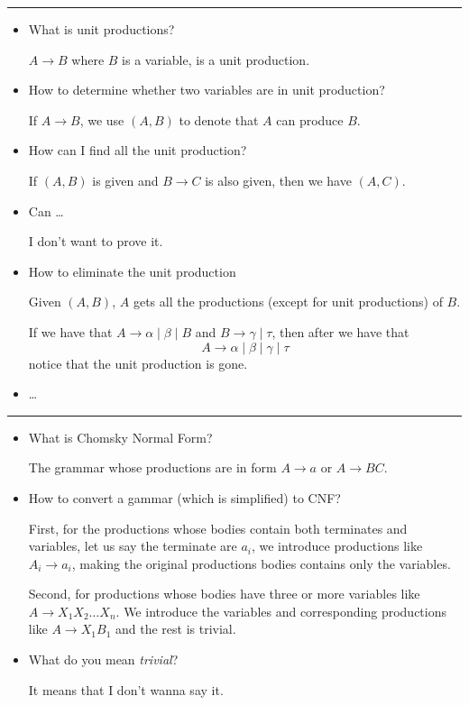 \documentclass[../main.tex]{subfiles}
\begin{document}
\hrule 

\begin{itemize}
\item What is unit productions? 

\(A \to B\) where \(B\) is a variable, is a unit production.

\item How to determine whether two variables are in unit production? 

If \(A \to B\), we use \( (A, B)\) to denote that \(A\) can 
produce \(B\). 

\item How can I find all the unit production? 

	If \( (A, B)\) is given and \(B \to C\) is 
also given, then we have \((A, C)\).

\item Can \dots

I don't want to prove it.

\item How to eliminate the unit production

Given \(( A, B)\), \(A\) gets all the productions (except for unit productions) of \(B\). 

If we have that \(A \to\alpha  \mid\beta\mid B\) and \(B \to\gamma \mid \tau\), then after we have that 
\[
A \to\alpha \mid \beta \mid\gamma \mid \tau
\]
notice that the unit production is gone. 
\item \dots
\end{itemize} 
\hrule 
\begin{itemize}
\item What is Chomsky Normal Form? 

The grammar whose productions are in form \(A \to a\) or \(A \to BC\). 

\item How to convert a gammar (which is simplified) to CNF? 

First, for the productions whose bodies contain both 
terminates and variables, let us say the terminate are \(a_{i}\), we introduce productions like \(A _{i} \to a_{i}\), making the original productions bodies contains only the variables. 

Second, for productions whose bodies have three or more variables like \(A \to X_1 X_2 \dots X_{n}\). We introduce the 
variables and corresponding productions like 
\(A \to X_1 B_1\) and 
the rest is trivial. 

\item What do you mean \emph{trivial}? 

It means that I don't wanna say it.
\end{itemize} 
\end{document}
